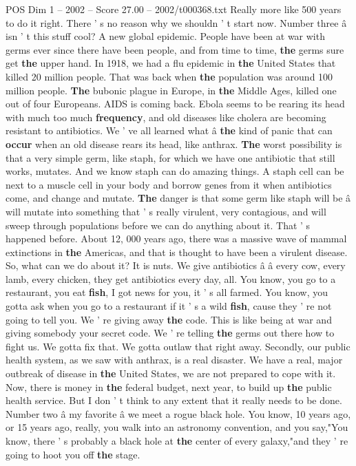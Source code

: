 \begin{textsample}{POS Dim 1 – 2002 – Score 27.00 – 2002/t000368.txt}
Really more like 500 years to do it right.
There ' s no reason why we shouldn ' t start now.
Number three â isn ' t this stuff cool?
A new global epidemic.
People have been at war with germs ever since there have been people, and from time to time, \textbf{the} germs sure get \textbf{the} upper hand.
In 1918, we had a flu epidemic in \textbf{the} United States that killed 20 million people.
That was back when \textbf{the} population was around 100 million people. \textbf{The} bubonic plague in Europe, in \textbf{the} Middle Ages, killed one out of four Europeans.
AIDS is coming back.
Ebola seems to be rearing its head with much too much \textbf{frequency}, and old diseases like cholera are becoming resistant to antibiotics.
We ' ve all learned what â \textbf{the} kind of panic that can \textbf{occur} when an old disease rears its head, like anthrax. \textbf{The} worst possibility is that a very simple germ, like staph, for which we have one antibiotic that still works, mutates.
And we know staph can do amazing things.
A staph cell can be next to a muscle cell in your body and borrow genes from it when antibiotics come, and change and mutate. \textbf{The} danger is that some germ like staph will be â will mutate into something that ' s really virulent, very contagious, and will sweep through populations before we can do anything about it.
That ' s happened before.
About 12, 000 years ago, there was a massive wave of mammal extinctions in \textbf{the} Americas, and that is thought to have been a virulent disease.
So, what can we do about it?
It is nuts.
We give antibiotics â â every cow, every lamb, every chicken, they get antibiotics every day, all.
You know, you go to a restaurant, you eat \textbf{fish}, I got news for you, it ' s all farmed.
You know, you gotta ask when you go to a restaurant if it ' s a wild \textbf{fish}, cause they ' re not going to tell you.
We ' re giving away \textbf{the} code.
This is like being at war and giving somebody your secret code.
We ' re telling \textbf{the} germs out there how to fight us.
We gotta fix that.
We gotta outlaw that right away.
Secondly, our public health system, as we saw with anthrax, is a real disaster.
We have a real, major outbreak of disease in \textbf{the} United States, we are not prepared to cope with it.
Now, there is money in \textbf{the} federal budget, next year, to build up \textbf{the} public health service.
But I don ' t think to any extent that it really needs to be done.
Number two â my favorite â we meet a rogue black hole.
You know, 10 years ago, or 15 years ago, really, you walk into an astronomy convention, and you say,"You know, there ' s probably a black hole at \textbf{the} center of every galaxy,"and they ' re going to hoot you off \textbf{the} stage.

\end{textsample}
